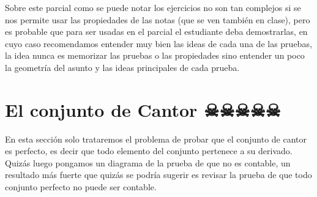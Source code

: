 \begin{note}
Sobre este parcial como se puede notar los ejercicios no son tan complejos si se nos permite usar las propiedades de las notas (que se ven también en clase), pero es probable que para ser usadas en el parcial el estudiante deba demostrarlas, en cuyo caso recomendamos entender muy bien las ideas de cada una de las pruebas, la idea nunca es memorizar las pruebas o las propiedades sino entender un poco la geometría del asunto y las ideas principales de cada prueba.
\end{note}

\section{El conjunto de Cantor ☠☠☠☠☠}

\begin{note}
En esta sección solo trataremos el problema de probar que el conjunto de cantor es perfecto, es decir que todo elemento del conjunto pertenece a su derivado. Quizás luego pongamos un diagrama de la prueba de que no es contable, un resultado más fuerte que quizás se podría sugerir es revisar la prueba de que todo conjunto perfecto no puede ser contable.
\end{note}

